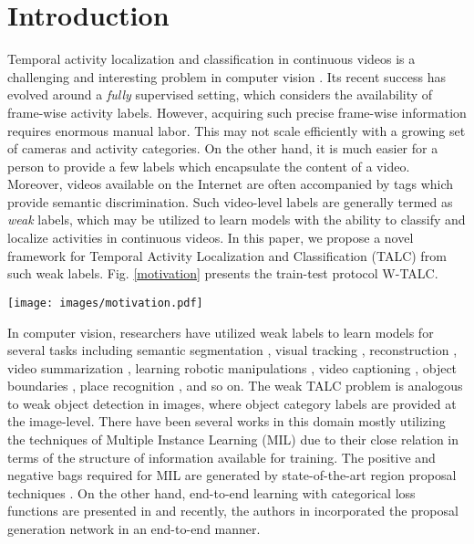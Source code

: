 \documentclass[runningheads]{llncs}
\begin{document}
\section{Introduction}
\label{intro}
Temporal activity localization and classification in continuous videos is a challenging and interesting problem in computer vision \cite{aggarwal2011human}. Its recent success \cite{xu2017r,zhao2017temporal} has evolved around a \textit{fully} supervised setting, which considers the availability of frame-wise activity labels. However, acquiring such precise frame-wise information requires enormous manual labor. This may not scale efficiently with a growing set of cameras and activity categories. On the other hand, it is much easier for a person to provide a few labels which encapsulate the content of a video. Moreover, videos available on the Internet are often accompanied by tags which provide semantic discrimination. Such video-level labels are generally termed as \textit{weak} labels, which may be utilized to learn models with the ability to classify and localize activities in continuous videos. In this paper, we propose a novel framework for Temporal Activity Localization and Classification (TALC) from such weak labels. Fig. \ref{motivation} presents the train-test protocol W-TALC. 

\begin{SCfigure}
	\centering
	\texttt{[image: images/motivation.pdf]}	
	\caption{This figure presents the train-test protocol of W-TALC. The training set consists of videos and the corresponding video-level activity tags. Whereas, while testing, the network not only estimates the labels of the activities in the video, but also temporally locates their occurrence representing the start () and end time (), category () and confidence of recognition () of the  activity located by the model.}
	\label{motivation}
\end{SCfigure}
In computer vision, researchers have utilized weak labels to learn models for several tasks including semantic segmentation \cite{hartmann2012weakly,khoreva2017simple,yan2017weakly}, visual tracking \cite{zhong2014visual}, reconstruction \cite{tulyakov2017weakly,kanazawa2016warpnet}, video summarization \cite{panda2017weakly}, learning robotic manipulations \cite{singh2017gplac}, video captioning \cite{shen2017weakly}, object boundaries \cite{khoreva2016weakly}, place recognition \cite{arandjelovic2016netvlad}, and so on. The weak TALC problem is analogous to weak object detection in images, where object category labels are provided at the image-level. There have been several works in this domain mostly utilizing the techniques of Multiple Instance Learning (MIL) \cite{zhou2004multi} due to their close relation in terms of the structure of information available for training. 
The positive and negative bags required for MIL are generated by state-of-the-art region proposal techniques \cite{li2016weakly,jie2017deep}. On the other hand, end-to-end learning with categorical loss functions are presented in \cite{durand2017wildcat,durand2016weldon,diba2016weakly,singh2017hide} and recently, the authors in \cite{zhu2017soft} incorporated the proposal generation network in an end-to-end manner. 
\end{document}

